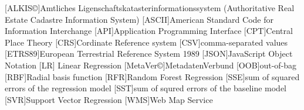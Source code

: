 \documentclass[a4paper, 11pt, oneside]{Thesis}  %
\begin{document}
\begin{acronym}
[ALKIS\copyright]{Amtliches Ligenschaftskatasterinformationssystem (Authoritative Real Estate Cadastre Information System)}
[ASCII]{American Standard Code for Information Interchange}
[API]{Application Programming Interface}
[CPT]{Central Place Theory}
[CRS]{Cordinate Reference system}
[CSV]{comma-separated values}
[ETRS89]{European Terrestrial Reference System 1989}
[JSON]{JavaScript Object Notation}
[LR] {Linear Regression}
[MetaVer\copyright]{MetadatenVerbund}
[OOB]{out-of-bag}
[RBF]{Radial basis function}
[RFR]{Random Forest Regression}
[SSE]{sum of squared errors of the regression model}
[SST]{sum of squred errors of the baseline model}
[SVR]{Support Vector Regression}
[WMS]{Web Map Service}

\end{acronym}

{

}

{
}

\end{document}
